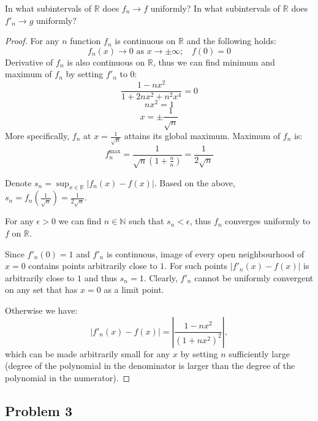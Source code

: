 \documentclass{article}
\begin{document}
\begin{tcolorbox}
In what subintervals of $\mathbb{R}$ does $f_n \to f$ uniformly? In what subintervals of $\mathbb{R}$ does $f'_n \to g$ uniformly?
\end{tcolorbox}
\begin{proof}

For any $n$ function $f_n$ is continuous  on $\mathbb{R}$ and the following holds:
$$ f_n(x) \to 0 \text{ as } x \to \pm \infty; \>\>\>\> f(0) = 0 $$
Derivative of $f_n$ is also continuous on $\mathbb{R}$, thus we can find minimum and maximum of $f_n$ by setting $f'_n$ to $0$:
$$ \frac{1-nx^2}{1+2nx^2+n^2x^4} = 0 $$
$$ nx^2 = 1 $$
$$ x = \pm \frac{1}{\sqrt{n}} $$
More specifically, $f_n$ at $x=\frac{1}{\sqrt{n}}$ attains its global maximum. Maximum of $f_n$ is:
$$ f^{\text{max}}_n = \frac{1}{\sqrt{n}(1+\frac{n}{n})} = \frac{1}{2\sqrt{n}} $$

Denote $s_n = \sup_{x\in\mathbb{R}} |f_n(x)-f(x)|$. Based on the above, $s_n = f_n \left( \frac{1}{\sqrt{n}} \right) = \frac{1}{2\sqrt{n}}$.

For any $\epsilon>0$ we can find $n\in\mathbb{N}$ such that $s_n < \epsilon$, thus $f_n$ converges uniformly to $f$ on $\mathbb{R}$.

Since $f'_n(0)=1$ and $f'_n$ is continuous, image of every open neighbourhood of $x=0$ contains points arbitrarily close to $1$. For such points $|f'_n(x)-f(x)|$ is arbitrarily close to $1$ and thus $s_n = 1$. Clearly, $f'_n$ cannot be uniformly convergent on any set that has $x=0$ as a limit point.

Otherwise we have:
$$ | f'_n(x) - f(x) | = \left| \frac{1-nx^2}{(1+nx^2)^2} \right|, $$
which can be made arbitrarily small for any $x$ by setting $n$ sufficiently large (degree of the polynomial in the denominator is larger than the degree of the polynomial in the numerator).

\end{proof}

\subsection*{Problem 3}
\end{document}
